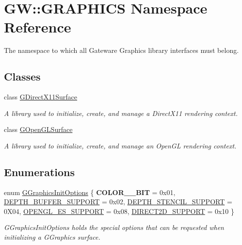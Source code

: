 \hypertarget{namespaceGW_1_1GRAPHICS}{}\section{GW\+:\+:G\+R\+A\+P\+H\+I\+CS Namespace Reference}
\label{namespaceGW_1_1GRAPHICS}


The namespace to which all Gateware Graphics library interfaces must belong.  


\subsection*{Classes}
\begin{DoxyCompactItemize}
\item 
class \mbox{\hyperlink{classGW_1_1GRAPHICS_1_1GDirectX11Surface}{G\+Direct\+X11\+Surface}}
\begin{DoxyCompactList}\small\item\em A library used to initialize, create, and manage a Direct\+X11 rendering context. \end{DoxyCompactList}\item 
class \mbox{\hyperlink{classGW_1_1GRAPHICS_1_1GOpenGLSurface}{G\+Open\+G\+L\+Surface}}
\begin{DoxyCompactList}\small\item\em A library used to initialize, create, and manage an Open\+GL rendering context. \end{DoxyCompactList}\end{DoxyCompactItemize}
\subsection*{Enumerations}
\begin{DoxyCompactItemize}
\item 
enum \mbox{\hyperlink{namespaceGW_1_1GRAPHICS_afbd9d6f65375744d2338ce060d42c85b}{G\+Graphics\+Init\+Options}} \{ \newline
{\bfseries C\+O\+L\+O\+R\+\_\+\_\+\+B\+IT} = 0x01, 
\mbox{\hyperlink{namespaceGW_1_1GRAPHICS_afbd9d6f65375744d2338ce060d42c85ba1bade4c85d55718f2b27dcc38c332a3a}{D\+E\+P\+T\+H\+\_\+\+B\+U\+F\+F\+E\+R\+\_\+\+S\+U\+P\+P\+O\+RT}} = 0x02, 
\mbox{\hyperlink{namespaceGW_1_1GRAPHICS_afbd9d6f65375744d2338ce060d42c85bacac34b90e4af450189dd5e824cbbd452}{D\+E\+P\+T\+H\+\_\+\+S\+T\+E\+N\+C\+I\+L\+\_\+\+S\+U\+P\+P\+O\+RT}} = 0\+X04, 
\mbox{\hyperlink{namespaceGW_1_1GRAPHICS_afbd9d6f65375744d2338ce060d42c85bae59cf357d12d379a206c08211dedc57f}{O\+P\+E\+N\+G\+L\+\_\+\+E\+S\+\_\+\+S\+U\+P\+P\+O\+RT}} = 0x08, 
\newline
\mbox{\hyperlink{namespaceGW_1_1GRAPHICS_afbd9d6f65375744d2338ce060d42c85ba9c847baaca0bdcb897b2332cc8d3b5dc}{D\+I\+R\+E\+C\+T2\+D\+\_\+\+S\+U\+P\+P\+O\+RT}} = 0x10
 \}
\begin{DoxyCompactList}\small\item\em G\+Graphics\+Init\+Options holds the special options that can be requested when initializing a G\+Graphics surface. \end{DoxyCompactList}\end{DoxyCompactItemize}
